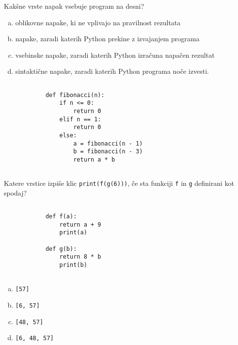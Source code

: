 \documentclass[arhiv, 10pt]{../izpit}
\newcommand{\inlinepy}[1]{\texttt{#1}}
\begin{document}
        \naloga*
        \begin{multicols}{2}
        \noindent
        Kakšne vrste napak vsebuje program na desni?

        \begin{enumerate}[(a)]
\item oblikovne napake, ki ne vplivajo na pravilnost rezultata
\item napake, zaradi katerih Python prekine z izvajanjem programa
\item vsebinske napake, zaradi katerih Python izračuna napačen rezultat
\item sintaktične napake, zaradi katerih Python programa noče izvesti.
\end{enumerate}

        \columnbreak

        \begin{verbatim}
        
            def fibonacci(n):
                if n <= 0:
                    return 0
                elif n == 1:
                    return 0
                else:
                    a = fibonacci(n - 1)
                    b = fibonacci(n - 3)
                    return a * b
            
        \end{verbatim}

        \end{multicols}

    
        \naloga*
        Katere vrstice izpiše klic \inlinepy{print(f(g(6)))}, če sta funkciji \inlinepy{f} in \inlinepy{g} definirani kot spodaj?

        \begin{multicols}{2}
        \begin{verbatim}
        
            def f(a):
                return a + 9
                print(a)

            def g(b):
                return 8 * b
                print(b)
        
        \end{verbatim}

        \begin{enumerate}[(a)]
\item \inlinepy{[57]}
\item \inlinepy{[6, 57]}
\item \inlinepy{[48, 57]}
\item \inlinepy{[6, 48, 57]}
\end{enumerate}

        \end{multicols}
    
\end{document}
